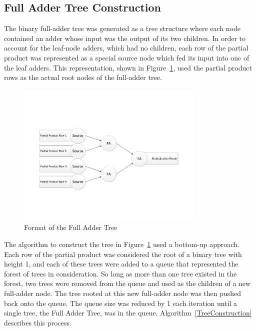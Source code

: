 \documentclass{article}
\begin{document}
\subsection{Full Adder Tree Construction}
The binary full-adder tree was generated as a tree structure where each node contained an adder whose input was the output of its two children. In order to account for the leaf-node adders, which had no children, each row of the partial product was represented as a special source node which fed its input into one of the leaf adders. This representation, shown in Figure~\ref{TreeFormat}, used the partial product rows as the actual root nodes of the full-adder tree.

\begin{figure}[h]
	\begin{center}
	\includegraphics[width=0.8\textwidth]{TreeFormat}
	\end{center}
	\caption{Format of the Full Adder Tree}
	\label{TreeFormat}
\end{figure}

The algorithm to construct the tree in Figure~\ref{TreeFormat} used a bottom-up approach. Each row of the partial product was considered the root of a binary tree with height 1, and each of these trees were added to a queue that represented the forest of trees in consideration. So long as more than one tree existed in the forest, two trees were removed from the queue and used as the children of a new full-adder node. The tree rooted at this new full-adder node was then pushed back onto the queue. The queue size was reduced by 1 each iteration until a single tree, the Full Adder Tree, was in the queue. Algorithm~\ref{TreeConstruction} describes this process.
\end{document}
